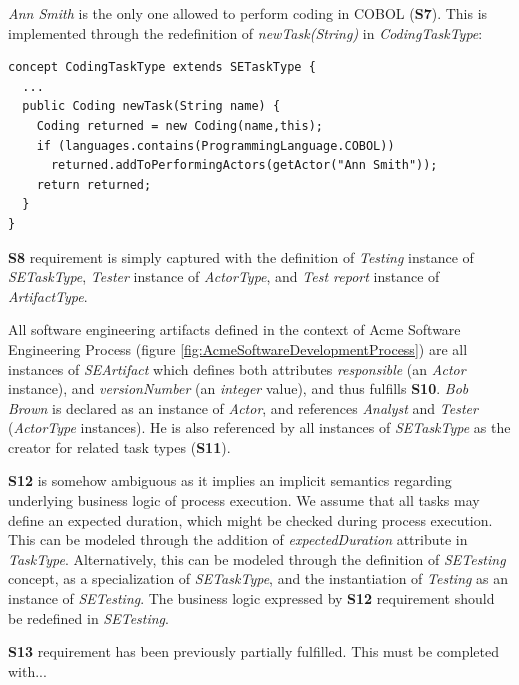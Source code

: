 \textit{Ann Smith} is the only one allowed to perform coding in COBOL (\textbf{S7}). This is implemented through the redefinition of \textit{newTask(String)} in \textit{CodingTaskType}:

\begin{lstlisting}
concept CodingTaskType extends SETaskType {
  ...
  public Coding newTask(String name) {
    Coding returned = new Coding(name,this); 
    if (languages.contains(ProgrammingLanguage.COBOL))
      returned.addToPerformingActors(getActor("Ann Smith"));
    return returned;
  }
}    
\end{lstlisting}

\textbf{S8} requirement is simply captured with the definition of \textit{Testing} instance of \textit{SETaskType}, \textit{Tester} instance of \textit{ActorType}, and \textit{Test report} instance of \textit{ArtifactType}.



All software engineering artifacts defined in the context of Acme Software Engineering Process (figure \ref{fig:AcmeSoftwareDevelopmentProcess}) are all instances of \textit{SEArtifact} which defines both attributes \textit{responsible} (an \textit{Actor} instance), and \textit{versionNumber} (an \textit{integer} value), and thus fulfills \textbf{S10}. \textit{Bob Brown} is declared as an instance of \textit{Actor}, and references \textit{Analyst} and \textit{Tester} (\textit{ActorType} instances). He is also referenced by all instances of \textit{SETaskType} as the creator for related task types (\textbf{S11}).

\textbf{S12} is somehow ambiguous as it implies an implicit semantics regarding underlying business logic of process execution. We assume that all tasks may define an expected duration, which might be checked during process execution. This can be modeled through the addition of \textit{expectedDuration} attribute in \textit{TaskType}. Alternatively, this can be modeled through the definition of \textit{SETesting} concept, as a specialization of \textit{SETaskType}, and the instantiation of \textit{Testing} as an instance of \textit{SETesting}. The business logic expressed by \textbf{S12} requirement should be redefined in \textit{SETesting}.

\textbf{S13} requirement has been previously partially fulfilled. This must be completed with...


